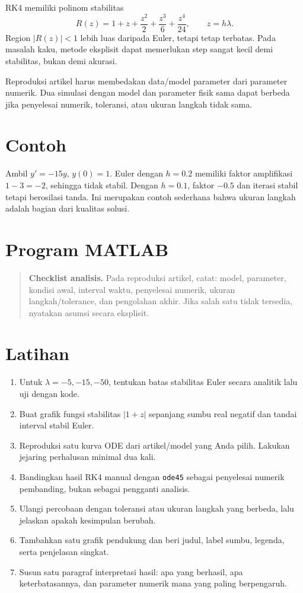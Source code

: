 \documentclass[book,english,noindex,lean,nobackpage,nocopyright,noupdate,nofiglist,notablist]{enacom}
\newcommand{\AnalysisCheck}[1]{\begin{quote}\textbf{Checklist analisis.} #1\end{quote}}
\begin{document}
RK4 memiliki polinom stabilitas
\begin{equation}
R(z)=1+z+\frac{z^2}{2}+\frac{z^3}{6}+\frac{z^4}{24},\qquad z=h\lambda.
\end{equation}
Region $|R(z)|<1$ lebih luas daripada Euler, tetapi tetap terbatas. Pada masalah kaku, metode eksplisit dapat memerlukan step sangat kecil demi stabilitas, bukan demi akurasi.

Reproduksi artikel harus membedakan data/model parameter dari parameter numerik. Dua simulasi dengan model dan parameter fisik sama dapat berbeda jika penyelesai numerik, toleransi, atau ukuran langkah tidak sama.

\section{Contoh}
Ambil $y'=-15y$, $y(0)=1$. Euler dengan $h=0.2$ memiliki faktor amplifikasi $1-3=-2$, sehingga tidak stabil. Dengan $h=0.1$, faktor $-0.5$ dan iterasi stabil tetapi berosilasi tanda. Ini merupakan contoh sederhana bahwa ukuran langkah adalah bagian dari kualitas solusi.

\section{Program MATLAB}


\AnalysisCheck{Pada reproduksi artikel, catat: model, parameter, kondisi awal, interval waktu, penyelesai numerik, ukuran langkah/tolerance, dan pengolahan akhir. Jika salah satu tidak tersedia, nyatakan asumsi secara eksplisit.}

\section{Latihan}
\begin{enumerate}
\item Untuk $\lambda=-5,-15,-50$, tentukan batas stabilitas Euler secara analitik lalu uji dengan kode.
\item Buat grafik fungsi stabilitas $|1+z|$ sepanjang sumbu real negatif dan tandai interval stabil Euler.
\item Reproduksi satu kurva ODE dari artikel/model yang Anda pilih. Lakukan jejaring perhalusan minimal dua kali.
\item Bandingkan hasil RK4 manual dengan \texttt{ode45} sebagai penyelesai numerik pembanding, bukan sebagai pengganti analisis.

\item Ulangi percobaan dengan toleransi atau ukuran langkah yang berbeda, lalu jelaskan apakah kesimpulan berubah.
\item Tambahkan satu grafik pendukung dan beri judul, label sumbu, legenda, serta penjelasan singkat.
\item Susun satu paragraf interpretasi hasil: apa yang berhasil, apa keterbatasannya, dan parameter numerik mana yang paling berpengaruh.

\end{enumerate}
\end{document}
